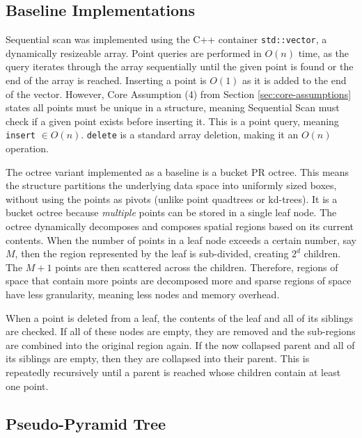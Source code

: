 \subsection{Baseline Implementations}
 
Sequential scan was implemented using the C++ container \texttt{std::vector}, a dynamically resizeable array.  Point queries are performed in $O(n)$ time, as the query iterates through the array sequentially until the given point is found or the end of the array is reached. Inserting a point is $O(1)$ as it is added to the end of the vector. However, Core Assumption (4) from Section \ref{sec:core-assumptions} states all points must be unique in a structure, meaning Sequential Scan must check if a given point exists before inserting it. This is a point query, meaning \texttt{insert} $\in O(n)$. \texttt{delete} is a standard array deletion, making it an $O(n)$ operation.

The octree variant implemented as a baseline is a bucket PR octree. This means the structure partitions the underlying data space into uniformly sized boxes, without using the points as pivots (unlike point quadtrees or kd-trees). It is a bucket octree because \textit{multiple} points can be stored in a single leaf node. The octree dynamically decomposes and composes spatial regions based on its current contents. When the number of points in a leaf node exceeds a certain number, say $M$, then the region represented by the leaf is sub-divided, creating $2^d$ children. The $M + 1$ points are then scattered across the children. Therefore, regions of space that contain more points are decomposed more and sparse regions of space have less granularity, meaning less nodes and memory overhead.

When a point is deleted from a leaf, the contents of the leaf and all of its siblings are checked. If all of these nodes are empty, they are removed and the sub-regions are combined into the original region again. If the now collapsed parent and all of its siblings are empty, then they are collapsed into their parent. This is repeatedly recursively until a parent is reached whose children contain at least one point.

\subsection{Pseudo-Pyramid Tree}

